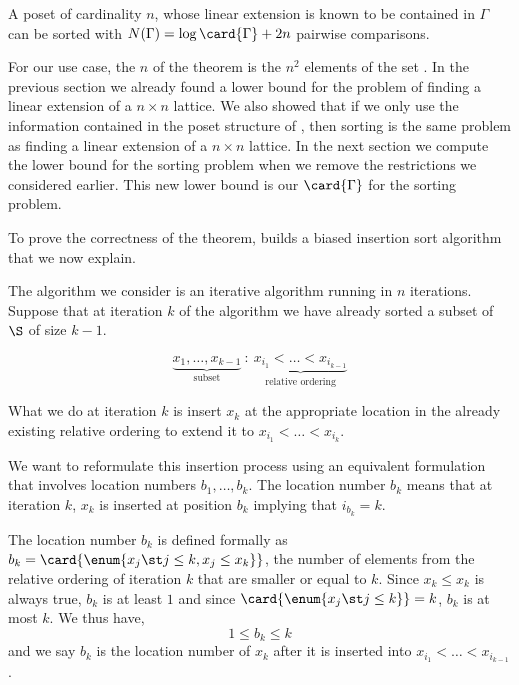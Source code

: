 \begin{theorem}\label{theorem:fredman:1976}
A poset of cardinality $n$, whose linear extension is known to be contained in
$\Gamma$ can be sorted with $N(\Gamma) = \log \card{\Gamma} + 2n$ pairwise
comparisons.
\end{theorem}

For our use case, the $n$ of the theorem is the $n^2$ elements of the set
\XY. In the previous section we already found a lower bound for the problem of
finding a linear extension of a \(n \times n\) lattice. We also showed that if
we only use the information contained in the poset structure of \XY, then
sorting \XY is the same problem as finding a linear extension of a \(n \times
n\) lattice. In the next section we compute the lower bound for the
sorting \XY problem when we remove the restrictions we considered earlier. This
new lower bound is our $\card{\Gamma}$ for the sorting \XY problem.

To prove the correctness of the theorem, \citet{fredman:1976} builds a biased
insertion sort algorithm that we now explain.

The algorithm we consider is an iterative algorithm running in \(n\)
iterations. Suppose that at iteration \(k\) of the algorithm we have already sorted a
subset of \(\S\) of size \(k-1\).

\begin{displaymath}
\underbrace{x_1, \ldots, x_{k-1}}_{\text{subset}}~:~\underbrace{x_{i_1} <
\ldots < x_{i_{k-1}}}_{\text{relative ordering}}
\end{displaymath}

What we do at iteration $k$ is insert $x_k$ at the appropriate location
in the already existing relative ordering to extend it to $x_{i_1} < \ldots <
x_{i_k}$.

We want to reformulate this insertion process using an equivalent formulation
that involves location numbers $b_1, \ldots, b_k$. The location
number $b_k$ means that at iteration $k$, $x_k$ is inserted at position
$b_k$ implying that $i_{b_k} = k$.

The location number $b_k$ is defined formally as $b_k = \card{\enum{x_j \st j
\le k, x_j \le x_k}}$, \ie the number of elements from the relative ordering
of iteration $k$ that are smaller or equal to $k$. Since $x_k \le x_k$ is
always true, $b_k$ is at least $1$ and since $\card{\enum{x_j \st j \le k}} =
k$, $b_k$ is at most $k$. We thus have,
$$ 1 \le b_k \le k$$
and we say $b_k$ is the location number of $x_k$ after it is inserted into
$x_{i_1} < \ldots < x_{i_{k-1}}$.

